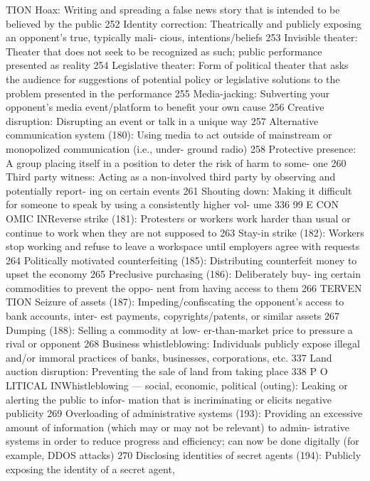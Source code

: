 \documentclass[twoside,a4paper,12pt,fleqn,openany]{extbook}
\begin{document}
TION
Hoax: Writing and spreading a false news
story that is intended to be believed by the
public
 252
Identity correction: Theatrically and publicly
exposing an opponent’s true, typically mali-
cious, intentions/beliefs
 253
Invisible theater: Theater that does not seek
to be recognized as such; public performance
presented as reality
 254
Legislative theater: Form of political theater
that asks the audience for suggestions of
potential policy or legislative solutions to the
problem presented in the performance 255
Media-jacking: Subverting your opponent’s
media event/platform to benefit your own
cause
 256
Creative disruption: Disrupting an event or talk
in a unique way
 257
Alternative communication system (180):
Using media to act outside of mainstream or
monopolized communication (i.e., under-
ground radio)
 258
Protective presence: A group placing itself in
a position to deter the risk of harm to some-
one
 260
Third party witness: Acting as a non-involved
third party by observing and potentially report-
ing on certain events
 261
Shouting down: Making it difficult for someone
to speak by using a consistently higher vol-
ume
 336
99
E CON OMIC INReverse strike (181): Protesters or workers
work harder than usual or continue to work
when they are not supposed to
 263
Stay-in strike (182): Workers stop working and
refuse to leave a workspace until employers
agree with requests
 264
Politically motivated counterfeiting (185):
Distributing counterfeit money to upset the
economy
 265
Preclusive purchasing (186): Deliberately buy-
ing certain commodities to prevent the oppo-
nent from having access to them
 266
TERVEN TION
Seizure of assets (187): Impeding/confiscating
the opponent’s access to bank accounts, inter-
est payments, copyrights/patents, or similar
assets
 267
Dumping (188): Selling a commodity at low-
er-than-market price to pressure a rival or
opponent
 268
Business whistleblowing: Individuals publicly
expose illegal and/or immoral practices of
banks, businesses, corporations, etc.
 337
Land auction disruption: Preventing the sale
of land from taking place
 338
P O LITICAL INWhistleblowing — social, economic, political
(outing): Leaking or alerting the public to infor-
mation that is incriminating or elicits negative
publicity
 269
Overloading of administrative systems (193):
Providing an excessive amount of information
(which may or may not be relevant) to admin-
istrative systems in order to reduce progress
and efficiency; can now be done digitally (for
example, DDOS attacks)
 270
Disclosing identities of secret agents (194):
Publicly exposing the identity of a secret agent,
\end{document}
